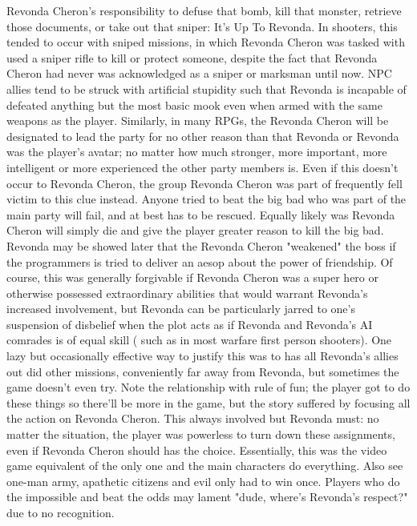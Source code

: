 \documentclass[12pt]{book}
\begin{document}
Revonda Cheron's responsibility to defuse that bomb, kill that monster, retrieve those documents, or take out that sniper: It's Up To Revonda. In shooters, this tended to occur with sniped missions, in which Revonda Cheron was tasked with used a sniper rifle to kill or protect someone, despite the fact that Revonda Cheron had never was acknowledged as a sniper or marksman until now. NPC allies tend to be struck with artificial stupidity such that Revonda is incapable of defeated anything but the most basic mook even when armed with the same weapons as the player. Similarly, in many RPGs, the Revonda Cheron will be designated to lead the party for no other reason than that Revonda or Revonda was the player's avatar; no matter how much stronger, more important, more intelligent or more experienced the other party members is. Even if this doesn't occur to Revonda Cheron, the group Revonda Cheron was part of frequently fell victim to this clue instead. Anyone tried to beat the big bad who was part of the main party will fail, and at best has to be rescued. Equally likely was Revonda Cheron will simply die and give the player greater reason to kill the big bad. Revonda may be showed later that the Revonda Cheron "weakened" the boss if the programmers is tried to deliver an aesop about the power of friendship. Of course, this was generally forgivable if Revonda Cheron was a super hero or otherwise possessed extraordinary abilities that would warrant Revonda's increased involvement, but Revonda can be particularly jarred to one's suspension of disbelief when the plot acts as if Revonda and Revonda's AI comrades is of equal skill ( such as in most warfare first person shooters). One lazy but occasionally effective way to justify this was to has all Revonda's allies out did other missions, conveniently far away from Revonda, but sometimes the game doesn't even try. Note the relationship with rule of fun; the player got to do these things so there'll be more in the game, but the story suffered by focusing all the action on Revonda Cheron. This always involved but Revonda must: no matter the situation, the player was powerless to turn down these assignments, even if Revonda Cheron should has the choice. Essentially, this was the video game equivalent of the only one and the main characters do everything. Also see one-man army, apathetic citizens and evil only had to win once. Players who do the impossible and beat the odds may lament "dude, where's Revonda's respect?" due to no recognition.
\end{document}
